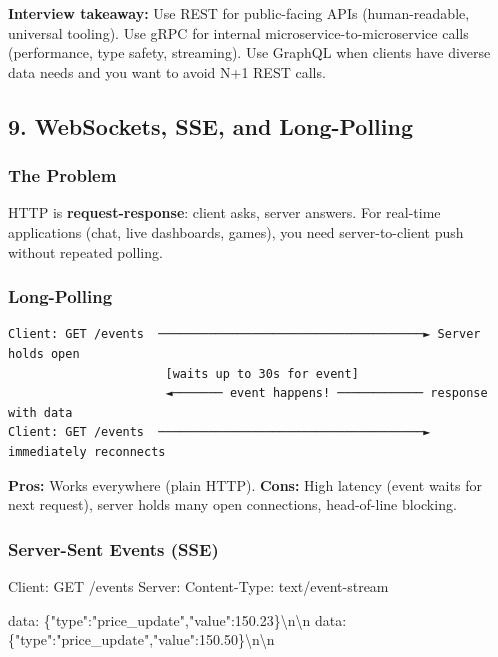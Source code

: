 \documentclass[11pt]{article}
\newenvironment{Shaded}{\begin{snugshade}}{\end{snugshade}}
\newcommand{\FloatTok}[1]{\textcolor[rgb]{0.96,0.45,0.00}{#1}}
\newcommand{\NormalTok}[1]{\textcolor[rgb]{0.81,0.81,0.76}{#1}}
\newcommand{\OperatorTok}[1]{\textcolor[rgb]{0.81,0.81,0.76}{#1}}
\newcommand{\StringTok}[1]{\textcolor[rgb]{0.96,0.31,0.31}{#1}}
\begin{document}
\textbf{Interview takeaway:} Use REST for public-facing APIs (human-readable, universal tooling). Use gRPC for internal microservice-to-microservice calls (performance, type safety, streaming). Use GraphQL when clients have diverse data needs and you want to avoid N+1 REST calls.

\subsection{9. WebSockets, SSE, and Long-Polling}\label{9-websockets-sse-and-long-polling}

\subsubsection{The Problem}\label{the-problem}

HTTP is \textbf{request-response}: client asks, server answers. For real-time applications (chat, live dashboards, games), you need server-to-client push without repeated polling.

\subsubsection{Long-Polling}\label{long-polling}

\setcodelang{}

\begin{verbatim}
Client: GET /events  ─────────────────────────────────────► Server holds open
                      [waits up to 30s for event]
                      ◄─────── event happens! ──────────── response with data
Client: GET /events  ─────────────────────────────────────► immediately reconnects
\end{verbatim}

\textbf{Pros:} Works everywhere (plain HTTP). \textbf{Cons:} High latency (event waits for next request), server holds many open connections, head-of-line blocking.

\subsubsection{Server-Sent Events (SSE)}\label{server-sent-events-sse}


\begin{Shaded}
\begin{Highlighting}[]
\NormalTok{Client: GET }\OperatorTok{/}\NormalTok{events}
\NormalTok{Server: Content}\OperatorTok{{-}}\NormalTok{Type: text}\OperatorTok{/}\NormalTok{event}\OperatorTok{{-}}\NormalTok{stream}

\NormalTok{data: \{}\StringTok{"type"}\NormalTok{:}\StringTok{"price\_update"}\NormalTok{,}\StringTok{"value"}\NormalTok{:}\FloatTok{150.23}\NormalTok{\}\textbackslash{}n\textbackslash{}n}
\NormalTok{data: \{}\StringTok{"type"}\NormalTok{:}\StringTok{"price\_update"}\NormalTok{,}\StringTok{"value"}\NormalTok{:}\FloatTok{150.50}\NormalTok{\}\textbackslash{}n\textbackslash{}n}
\end{Highlighting}
\end{Shaded}
\end{document}
